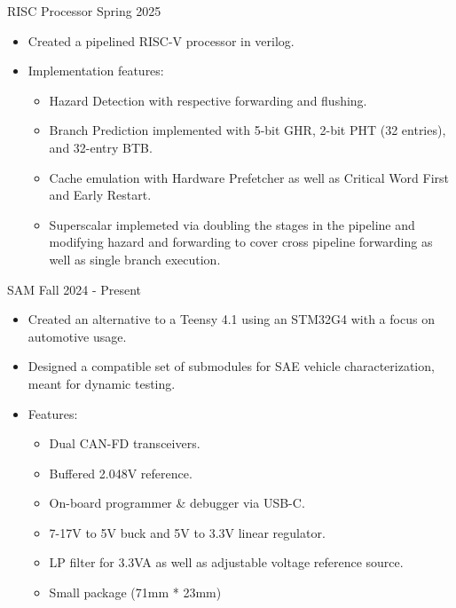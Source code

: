 \documentclass[9pt]{developercv} %
\begin{document}
\vspace{-14 pt}
\begin{entrylist}
    \entry
    {}
    {RISC Processor}
    {Spring 2025}
    {\vspace{-8pt}
    \begin{itemize}[noitemsep,topsep=0pt,parsep=0pt,partopsep=0pt, leftmargin=10pt]
    \item Created a pipelined RISC-V processor in verilog.
    \item Implementation features: 
        \begin{itemize}[noitemsep,topsep=0pt,parsep=0pt,partopsep=0pt,leftmargin=10pt]
            \item Hazard Detection with respective forwarding and flushing.
            \item Branch Prediction implemented with  5-bit GHR, 2-bit PHT (32 entries), and 32-entry BTB. 
            \item Cache emulation with Hardware Prefetcher as well as Critical Word First and Early Restart.
            \item Superscalar implemeted via doubling the stages in the pipeline and modifying hazard and forwarding to cover cross pipeline forwarding as well as single branch execution.
        \end{itemize}
    \end{itemize}
    }

    \entry
    {}
    {SAM}
    {Fall 2024 - Present}
    {\vspace{-8pt}
    \begin{itemize}[noitemsep,topsep=0pt,parsep=0pt,partopsep=0pt, leftmargin=10pt]
    \item Created an alternative to a Teensy 4.1 using an STM32G4 with a focus on automotive usage.
    \item Designed a compatible set of submodules for SAE vehicle characterization, meant for dynamic testing.
    \item Features:    
        \begin{itemize}[noitemsep,topsep=0pt,parsep=0pt,partopsep=0pt, leftmargin=10pt]
            \item Dual CAN-FD transceivers.
            \item Buffered 2.048V reference.
            \item On-board programmer \& debugger via USB-C.
            \item 7-17V to 5V buck and 5V to 3.3V linear regulator.
            \item LP filter for 3.3VA as well as adjustable voltage reference source. 
            \item Small package (71mm * 23mm)
        \end{itemize}
    \end{itemize}
    }
    
\end{entrylist}
\end{document}
